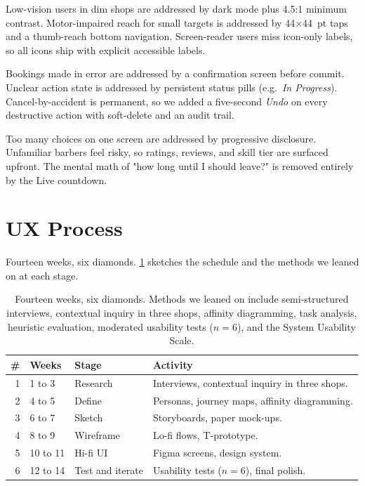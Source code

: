 \documentclass[12pt,a4paper]{article}
\begin{document}
\begin{description}[leftmargin=2.2em,style=nextline]
  \item[Accessibility]
    Low-vision users in dim shops are addressed by dark mode plus
    4.5:1 minimum contrast. Motor-impaired reach for small targets is
    addressed by 44$\times$44~pt taps and a thumb-reach bottom
    navigation. Screen-reader users miss icon-only labels, so all
    icons ship with explicit accessible labels.
  \item[Usability]
    Bookings made in error are addressed by a confirmation screen
    before commit. Unclear action state is addressed by persistent
    status pills (e.g.\ \emph{In Progress}). Cancel-by-accident is
    permanent, so we added a five-second \emph{Undo} on every
    destructive action with soft-delete and an audit trail.
  \item[Cognitive]
    Too many choices on one screen are addressed by progressive
    disclosure. Unfamiliar barbers feel risky, so ratings, reviews,
    and skill tier are surfaced upfront. The mental math of "how long
    until I should leave?" is removed entirely by the Live countdown.
\end{description}

\section{UX Process}
\label{sec:process}

Fourteen weeks, six diamonds. \cref{tab:process} sketches the
schedule and the methods we leaned on at each stage.

\begin{table}[H]
\centering\small
\begin{tabular}{@{}rlp{3.4cm}p{8.5cm}@{}}
\toprule
\# & \textbf{Weeks} & \textbf{Stage} & \textbf{Activity}\\
\midrule
1 & 1 to 3   & Research      & Interviews, contextual inquiry in three shops.\\
2 & 4 to 5   & Define        & Personas, journey maps, affinity diagramming.\\
3 & 6 to 7   & Sketch        & Storyboards, paper mock-ups.\\
4 & 8 to 9   & Wireframe     & Lo-fi flows, T-prototype.\\
5 & 10 to 11 & Hi-fi UI      & Figma screens, design system.\\
6 & 12 to 14 & Test and iterate & Usability tests ($n=6$), final polish.\\
\bottomrule
\end{tabular}
\caption{Fourteen weeks, six diamonds. Methods we leaned on include
semi-structured interviews, contextual inquiry in three shops,
affinity diagramming, task analysis, heuristic evaluation, moderated
usability tests ($n=6$), and the System Usability Scale.}
\label{tab:process}
\end{table}
\vspace{-30pt}
\end{document}
